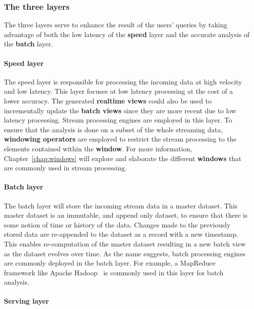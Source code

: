 \subsubsection{The three layers}
The three layers serve to enhance the result of the users' queries by taking 
advantage of both the low latency of the \textbf{speed} layer and the accurate analysis of the \textbf{batch}
layer. 

\paragraph{Speed layer}%
\label{par:Speed layer}
The speed layer is responsible for processing the incoming data at high velocity and low latency. 
This layer focuses at low latency processing at the cost of a lower accuracy. The generated 
\textbf{realtime views}  could also be used to incrementally update the \textbf{batch views} since they 
are more recent due to low latency processing. Stream processing engines are employed in this 
layer. To ensure that the 
analysis is done on a subset of the whole streaming data, \textbf{windowing operators} are employed 
to restrict the stream processing to the elements contained within the \textbf{window}. For more information,
Chapter~\ref{chap:windows} will explore and elaborate the different \textbf{windows} that 
are commonly used in stream processing. 

\paragraph{Batch layer}%
\label{par:Batch layer}
The batch layer will store the incoming stream data in a master dataset. This master dataset is an immutable,
and append only dataset, to ensure that there is some notion of time or history of the data. Changes made to 
the previously stored data are re-appended to the dataset as a record with a new timestamp.  
This enables re-computation of the master dataset resulting in a new batch view as the dataset evolves over time. 
As the name suggests, batch processing engines are commonly deployed in the batch layer. For example, 
a MapReduce~\cite{mapreduce} framework like Apache Hadoop~\cite{hadoop} is commonly used in this 
layer for batch analysis. 


\paragraph{Serving layer}%
\label{par:Serving layer}

